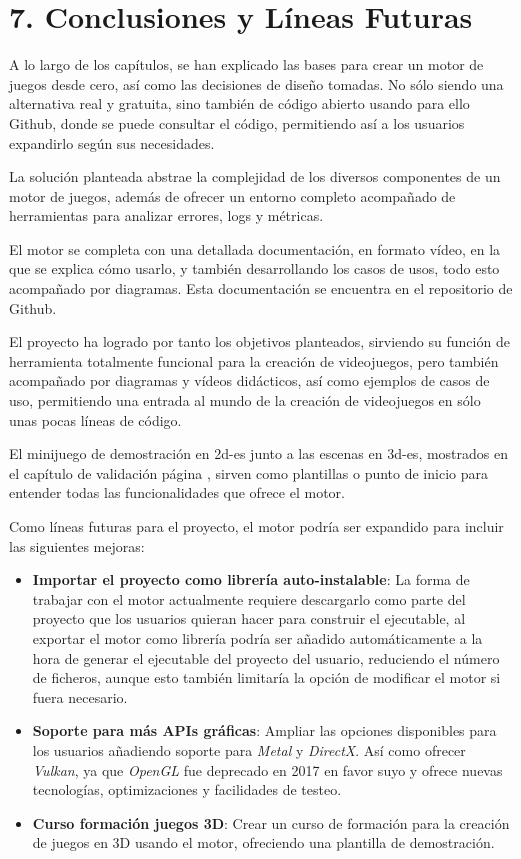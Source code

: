 \chapter*{7. Conclusiones y Líneas Futuras}\label{cap:conclusions}

A lo largo de los capítulos, se han explicado las bases para crear un motor de juegos desde cero, así como
las decisiones de diseño tomadas. No sólo siendo una alternativa real y gratuita, sino también de código
abierto usando para ello Github, donde se puede consultar el código\cite{project-repository}, permitiendo así a los 
usuarios expandirlo según sus necesidades.

La solución planteada abstrae la complejidad de los diversos componentes de un motor de juegos, además de ofrecer un 
entorno completo acompañado de herramientas para analizar errores, logs y métricas.

El motor se completa con una detallada documentación, en formato vídeo, en la que se explica cómo usarlo, y también
desarrollando los casos de usos, todo esto acompañado por diagramas. Esta documentación se encuentra en el repositorio de Github\cite{documentation}.

El proyecto ha logrado por tanto los objetivos planteados, sirviendo su función de herramienta totalmente funcional para la creación de videojuegos, pero también
acompañado por diagramas y vídeos didácticos, así como ejemplos de casos de uso, permitiendo una entrada al mundo de
la creación de videojuegos en sólo unas pocas líneas de código.

El minijuego de demostración en \gls{2d-es} junto a las escenas en \gls{3d-es}, mostrados en el capítulo de validación página \pageref{cap:validation}, sirven como 
plantillas o punto de inicio para entender todas las funcionalidades que ofrece el motor.

Como líneas futuras para el proyecto, el motor podría ser expandido para incluir las siguientes mejoras:

\begin{itemize}
	\item \textbf{Importar el proyecto como librería auto-instalable}: La forma de trabajar con el motor actualmente
	requiere descargarlo como parte del proyecto que los usuarios quieran hacer para construir el ejecutable, al exportar
    el motor como librería podría ser añadido automáticamente a la hora de generar el ejecutable del proyecto del usuario,
    reduciendo el número de ficheros, aunque esto también limitaría la opción de modificar el motor si fuera necesario.
    \item \textbf{Soporte para más APIs gráficas}: Ampliar las opciones disponibles para los usuarios añadiendo soporte
    para \textit{Metal}\cite{metal} y \textit{DirectX}\cite{direct11}. Así como ofrecer \textit{Vulkan}\cite{vulkan}, ya que \textit{OpenGL} fue deprecado en 2017 en 
    favor suyo y ofrece nuevas tecnologías, optimizaciones y facilidades de testeo.
    \item \textbf{Curso formación juegos 3D}: Crear un curso de formación para la creación de juegos en 3D usando el motor, ofreciendo una plantilla de demostración.
\end{itemize}